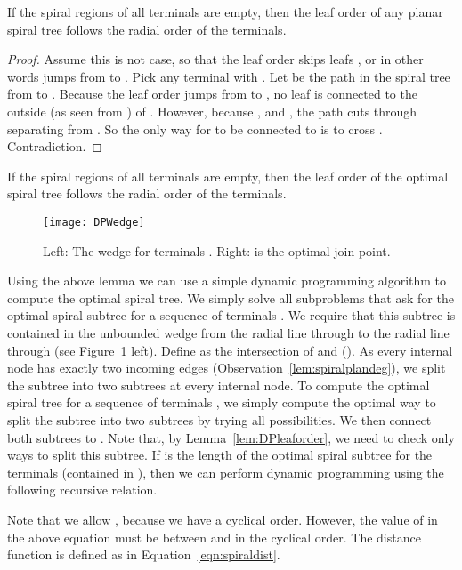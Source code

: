 \documentclass{journalA4}
\begin{document}
\begin{lemma}
\label{lem:DPleaforder}
If the spiral regions of all terminals are empty, then the leaf order of any planar spiral tree follows the radial order of the terminals.
\end{lemma}
\begin{proof}
Assume this is not case, so that the leaf order skips leafs , or in other words jumps from  to . Pick any terminal  with . Let  be the path in the spiral tree from  to . Because the leaf order jumps from  to , no leaf is connected to the outside (as seen from ) of . However, because ,  and , the path  cuts through  separating  from . So the only way for  to be connected to  is to cross . Contradiction.
\end{proof}

\begin{cor}
If the spiral regions of all terminals are empty, then the leaf order of the optimal spiral tree follows the radial order of the terminals.
\end{cor}

\begin{figure}[b]
  \centering
  \texttt{[image: DPWedge]}
  \caption{Left: The wedge  for terminals . Right:  is the optimal join point.}
  \label{fig:DPWedge}
\end{figure}

\noindent Using the above lemma we can use a simple dynamic programming algorithm to compute the optimal spiral tree. We simply solve all subproblems that ask for the optimal spiral subtree for a sequence of terminals . We require that this subtree is contained in the unbounded wedge  from the radial line through  to the radial line through  (see Figure~\ref{fig:DPWedge} left). Define  as the intersection of  and  (). As every internal node has exactly two incoming edges (Observation~\ref{lem:spiralplandeg}), we split the subtree into two subtrees at every internal node. To compute the optimal spiral tree for a sequence of terminals , we simply compute the optimal way to split the subtree into two subtrees by trying all possibilities. We then connect both subtrees to . Note that, by Lemma~\ref{lem:DPleaforder}, we need to check only  ways to split this subtree. If  is the length of the optimal spiral subtree for the terminals  (contained in ), then we can perform dynamic programming using the following recursive relation.



\noindent Note that we allow , because we have a cyclical order. However, the value of  in the above equation must be between  and  in the cyclical order. The distance function  is defined as in Equation~\ref{eqn:spiraldist}.
\end{document}
